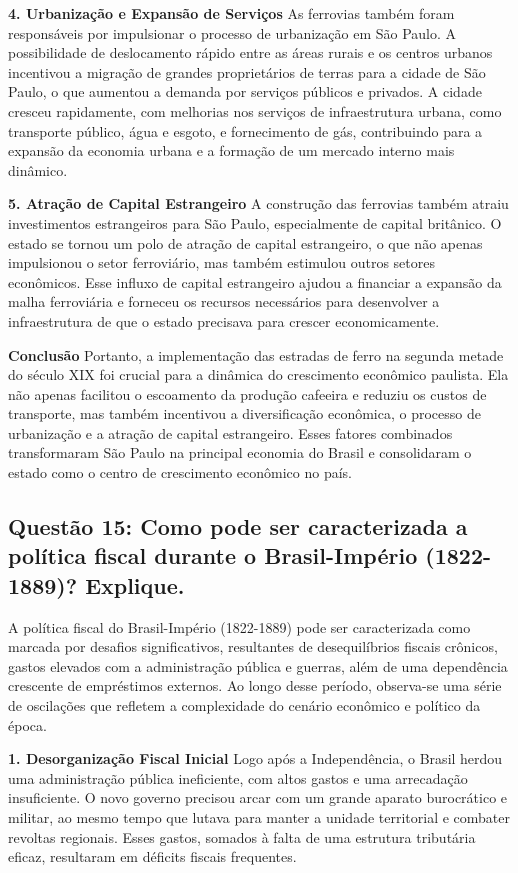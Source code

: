 \documentclass[a4paper,12pt]{article}[abntex2]
\begin{document}
\textbf{4. Urbanização e Expansão de Serviços}
As ferrovias também foram responsáveis por impulsionar o processo de urbanização em São Paulo. A possibilidade de deslocamento rápido entre as áreas rurais e os centros urbanos incentivou a migração de grandes proprietários de terras para a cidade de São Paulo, o que aumentou a demanda por serviços públicos e privados. A cidade cresceu rapidamente, com melhorias nos serviços de infraestrutura urbana, como transporte público, água e esgoto, e fornecimento de gás, contribuindo para a expansão da economia urbana e a formação de um mercado interno mais dinâmico.

\textbf{5. Atração de Capital Estrangeiro}
A construção das ferrovias também atraiu investimentos estrangeiros para São Paulo, especialmente de capital britânico. O estado se tornou um polo de atração de capital estrangeiro, o que não apenas impulsionou o setor ferroviário, mas também estimulou outros setores econômicos. Esse influxo de capital estrangeiro ajudou a financiar a expansão da malha ferroviária e forneceu os recursos necessários para desenvolver a infraestrutura de que o estado precisava para crescer economicamente.

\textbf{Conclusão}
Portanto, a implementação das estradas de ferro na segunda metade do século XIX foi crucial para a dinâmica do crescimento econômico paulista. Ela não apenas facilitou o escoamento da produção cafeeira e reduziu os custos de transporte, mas também incentivou a diversificação econômica, o processo de urbanização e a atração de capital estrangeiro. Esses fatores combinados transformaram São Paulo na principal economia do Brasil e consolidaram o estado como o centro de crescimento econômico no país.

\subsection{\textbf{Questão 15: Como pode ser caracterizada a política fiscal durante o Brasil-Império (1822-1889)? Explique.}}

A política fiscal do Brasil-Império (1822-1889) pode ser caracterizada como marcada por desafios significativos, resultantes de desequilíbrios fiscais crônicos, gastos elevados com a administração pública e guerras, além de uma dependência crescente de empréstimos externos. Ao longo desse período, observa-se uma série de oscilações que refletem a complexidade do cenário econômico e político da época.

\textbf{1. Desorganização Fiscal Inicial}
Logo após a Independência, o Brasil herdou uma administração pública ineficiente, com altos gastos e uma arrecadação insuficiente. O novo governo precisou arcar com um grande aparato burocrático e militar, ao mesmo tempo que lutava para manter a unidade territorial e combater revoltas regionais. Esses gastos, somados à falta de uma estrutura tributária eficaz, resultaram em déficits fiscais frequentes.
\end{document}
